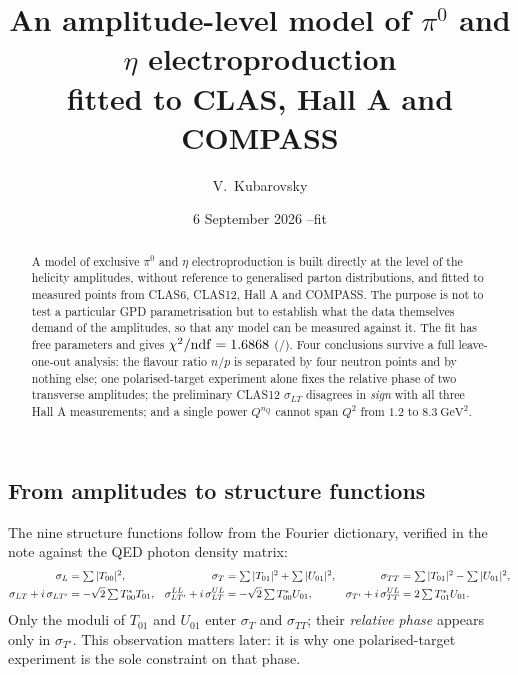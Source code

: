 \documentclass[11pt,a4paper]{article}
\title{An amplitude-level model of $\pi^0$ and $\eta$ electroproduction\\
       fitted to CLAS, Hall A and COMPASS}
\author{V.\ Kubarovsky}
\date{6 September 2026 \quad--\quad fit \texttt{\fittag}}
\newcommand{\sig}[1]{\sigma_{#1}}
\begin{document}
\maketitle

\begin{abstract}
\noindent
A model of exclusive $\pi^0$ and $\eta$ electroproduction is built directly at
the level of the helicity amplitudes, without reference to generalised parton
distributions, and fitted to \nfit{} measured points from CLAS6, CLAS12,
Hall A and COMPASS.  The purpose is not to test a particular GPD
parametrisation but to establish what the data themselves demand of the
amplitudes, so that any model can be measured against it.  The fit has \npar{}
free parameters and gives $\chi^2/\mathrm{ndf} = 1.6868$ (\chitot/\ndf).
Four conclusions survive a full leave-one-out analysis: the flavour ratio
$n/p$ is separated by four neutron points and by nothing else; one
polarised-target
experiment alone fixes the relative phase of two transverse amplitudes;
the preliminary CLAS12 $\sig{LT}$ disagrees in \emph{sign} with all three
Hall A measurements; and a single power $Q^{n_Q}$ cannot span $Q^2$ from $1.2$
to $8.3\ \mathrm{GeV}^2$.
\end{abstract}



\subsection{From amplitudes to structure functions}

The nine structure functions follow from the Fourier dictionary, verified in
the note against the QED photon density matrix:
\begin{align}
\sig{L} &= \textstyle\sum |T_{00}|^2, &
\sig{T} &= \textstyle\sum |T_{01}|^2 + \sum |U_{01}|^2, &
\sig{TT} &= \textstyle\sum |T_{01}|^2 - \sum |U_{01}|^2,\notag\\
\sig{LT} + i\,\sig{LT'} &= -\sqrt2 \textstyle\sum T_{00}^{*} T_{01}, &
\sig{LT'}^{LL} + i\,\sig{LT}^{UL} &= -\sqrt2 \textstyle\sum T_{00}^{*} U_{01}, &
\sig{T'} + i\,\sig{TT}^{UL} &= 2 \textstyle\sum T_{01}^{*} U_{01}.
\label{eq:gram}
\end{align}
Only the moduli of $T_{01}$ and $U_{01}$ enter $\sig{T}$ and $\sig{TT}$; their
\emph{relative phase} appears only in $\sig{T'}$.  This observation matters
later: it is why one polarised-target experiment is the sole constraint on that
phase.
\end{document}
